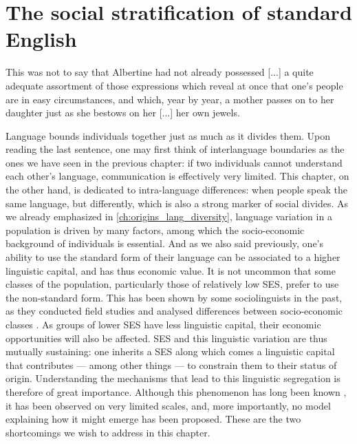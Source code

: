 \documentclass[../thesis.tex]{subfiles}
\begin{document}
\chapter{The social stratification of standard English}
\label{ch:ses_ling}

\epigraph{
  This was not to say that Albertine had not already possessed [...] a quite
  adequate assortment  of those expressions which reveal at once that one's people are
  in easy circumstances, and which, year by year, a mother passes on to her daughter
  just as she bestows on her [...]
  her own jewels.
}{
}

Language bounds individuals together just as much as it divides them. Upon reading the
last sentence, one may first think of interlanguage boundaries as the ones we have seen
in the previous chapter: if two individuals cannot understand each other's language,
communication is effectively very limited. This chapter, on the other hand, is dedicated
to intra-language differences: when people speak the same language, but differently,
which is also a strong marker of social divides. As we already emphasized in
\cref{ch:origins_lang_diversity}, language variation in a population is driven by many
factors, among which the socio-economic background of individuals is essential. And as
we also said previously, one's ability to use the standard form of their language can be
associated to a higher linguistic capital, and has thus economic value. It is not
uncommon that some classes of the population, particularly those of relatively low
\ac{SES}, prefer to use the non-standard form. This has been shown by some
sociolinguists in the past, as they conducted field studies and analysed differences
between socio-economic classes
\cite{LabovSocialStratification1966,TrudgillSocialDifferentiation1974}. As groups of
lower \ac{SES} have less linguistic capital, their economic opportunities will also be
affected. \Ac{SES} and this linguistic variation are thus mutually sustaining: one
inherits a \ac{SES} along which comes a linguistic capital that contributes --- among
other things --- to constrain them to their status of origin. Understanding the
mechanisms that lead to this linguistic segregation is therefore of great importance.
Although this phenomenon has long been known \cite{ChambersSociolinguisticTheory2007},
it has been observed on very limited scales, and, more importantly, no model explaining
how it might emerge has been proposed. These are the two shortcomings we wish to address
in this chapter. 
\end{document}
